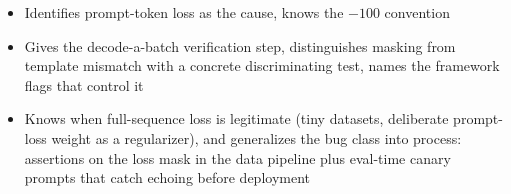 \begin{interviewq}

\goodgreat
\begin{itemize}
    \item {} Identifies prompt-token loss as the cause, knows the $-100$ convention
    \item {} Gives the decode-a-batch verification step, distinguishes masking from template mismatch with a concrete discriminating test, names the framework flags that control it
    \item {} Knows when full-sequence loss is legitimate (tiny datasets, deliberate prompt-loss weight as a regularizer), and generalizes the bug class into process: assertions on the loss mask in the data pipeline plus eval-time canary prompts that catch echoing before deployment
\end{itemize}

\end{interviewq}

